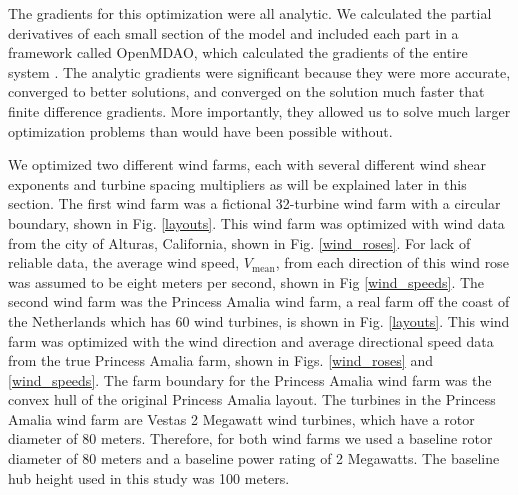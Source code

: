 \documentclass[WESD, manuscript]{copernicus}
\begin{document}
        The gradients for this optimization were all analytic. We calculated the partial derivatives of each small section of the model and included each part in a framework called OpenMDAO, which calculated the gradients of the entire system \citep{gray2010openmdao}. The analytic gradients were significant because they were more accurate, converged to better solutions, and converged on the solution much faster that finite difference gradients. More importantly, they allowed us to solve much larger optimization problems than would have been possible without. 
        
We optimized two different wind farms, each with several different wind shear exponents and turbine spacing multipliers as will be explained later in this section. 
The first wind farm was a fictional 32-turbine wind farm with a circular boundary, shown in Fig. \ref{layouts}.
This wind farm was optimized with wind data from the city of Alturas, California, shown in Fig. \ref{wind_roses}. For lack of reliable data, the average wind speed, $V_{\text{mean}}$, from each direction of this wind rose was assumed to be eight meters per second, shown in Fig \ref{wind_speeds}.
The second wind farm was the Princess Amalia wind farm, a real farm off the coast of the Netherlands which has 60 wind turbines, is shown in Fig. \ref{layouts}. This wind farm was optimized with the wind direction and average directional speed data from the true Princess Amalia farm, shown in Figs. \ref{wind_roses} and \ref{wind_speeds}. The farm boundary for the Princess Amalia wind farm was the convex hull of the original Princess Amalia layout. 
The turbines in the Princess Amalia wind farm are Vestas 2 Megawatt wind turbines, which have a rotor diameter of 80 meters. Therefore, for both wind farms we used a baseline rotor diameter of 80 meters and a baseline power rating of 2 Megawatts. The baseline hub height used in this study was 100 meters. 
\end{document}
